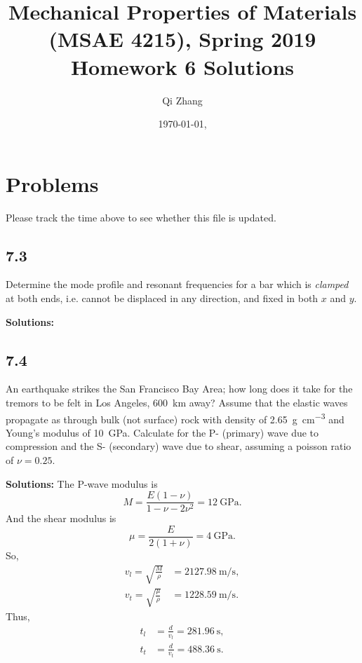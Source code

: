 \documentclass[12pt]{article}
\begin{document}

\title{Mechanical Properties of Materials (MSAE 4215), Spring 2019\\ Homework 6 Solutions}
\author{Qi Zhang}
\date{\today, \currenttime}

\maketitle

\tableofcontents
\listoffigures
\listoftables

\section{Problems}
Please track the time above to see whether this file is updated.

\subsection{7.3}
Determine the mode profile and resonant frequencies for a bar which is \textit{clamped}
at both ends, i.e. cannot be displaced in any direction, and fixed in both $x$ and $y$.

\textbf{Solutions:}

\subsection{7.4}
An earthquake strikes the San Francisco Bay Area;
how long does it take for the tremors to be felt in Los Angeles, \SI{600}{\kilo\meter} away?
Assume that the elastic waves propagate as through bulk (not surface) rock with density
of \SI{2.65}{\gram \per \cubic \centi \meter} and Young's modulus of \SI{10}{\giga\pascal}.
Calculate for the P- (primary) wave due to compression and the
S- (secondary) wave due to shear, assuming a poisson ratio of $\nu= 0.25$.

\textbf{Solutions:}
The P-wave modulus is
\begin{equation}
  M = \frac{ E (1 - \nu) }{ 1 - \nu - 2 \nu^2 } = \SI{12}{\giga\pascal}.
\end{equation}
And the shear modulus is
\begin{equation}
  \mu = \frac{ E }{ 2 ( 1 + \nu ) } = \SI{4}{\giga\pascal}.
\end{equation}
So,
\begin{align}
  v_l = \sqrt{\frac{ M }{ \rho }}   & = \SI{2127.98}{\meter\per\second}, \\
  v_t = \sqrt{\frac{ \mu }{ \rho }} & = \SI{1228.59}{\meter\per\second}.
\end{align}
Thus,
\begin{align}
  t_l & = \frac{ d }{ v_l } = \SI{281.96}{\second}, \\
  t_t & = \frac{ d }{ v_t } = \SI{488.36}{\second}.
\end{align}
\end{document}
